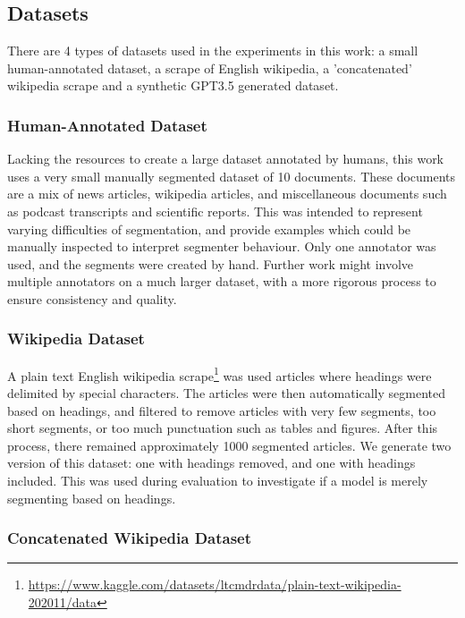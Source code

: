 \subsection{Datasets}

There are 4 types of datasets used in the experiments in this work: a small human-annotated dataset, a scrape of English wikipedia, a 'concatenated' wikipedia scrape and a synthetic GPT3.5 generated dataset.

\subsubsection{Human-Annotated Dataset}

Lacking the resources to create a large dataset annotated by humans, this work uses a very small manually segmented dataset of 10 documents. These documents are a mix of news articles, wikipedia articles, and miscellaneous documents such as podcast transcripts and scientific reports. This was intended to represent varying difficulties of segmentation, and provide examples which could be manually inspected to interpret segmenter behaviour. Only one annotator was used, and the segments were created by hand. Further work might involve multiple annotators on a much larger dataset, with a more rigorous process to ensure consistency and quality.

\subsubsection{Wikipedia Dataset}

A plain text English wikipedia scrape\footnote{\url{https://www.kaggle.com/datasets/ltcmdrdata/plain-text-wikipedia-202011/data}} was used articles where headings were delimited by special characters. The articles were then automatically segmented based on headings, and filtered to remove articles with very few segments, too short segments, or too much punctuation such as tables and figures. After this process, there remained approximately 1000 segmented articles. We generate two version of this dataset: one with headings removed, and one with headings included. This was used during evaluation to investigate if a model is merely segmenting based on headings.

\subsubsection{Concatenated Wikipedia Dataset}


